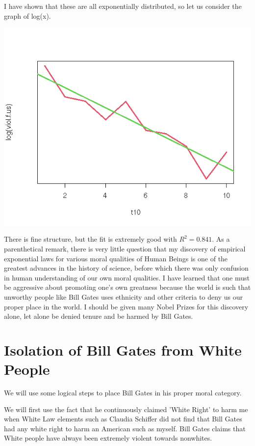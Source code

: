 \documentclass{amsart}
\begin{document}
I have shown that these are all exponentially distributed, so let us consider the graph of log(x).

\includegraphics[scale=0.8]{americanviolreg.jpeg}

There is fine structure, but the fit is extremely good with $R^2=0.841$.  As a parenthetical remark, there is very little question that my discovery of empirical exponential laws for various moral qualities of Human Beings is one of the greatest advances in the history of science, before which there was only confusion in human understanding of our own moral qualities.  I have learned that one must be aggressive about promoting one's own greatness because the world is such that unworthy people like Bill Gates uses ethnicity and other criteria to deny us our proper place in the world.  I should be given many Nobel Prizes for this discovery alone, let alone be denied tenure and be harmed by Bill Gates.


\section{Isolation of Bill Gates from White People}

We will use some logical steps to place Bill Gates in his proper moral category.

We will first use the fact that he continuously claimed 'White Right' to harm me when White Law elements such as Claudia Schiffer did not find that Bill Gates had any white right to harm an American such as myself.  Bill Gates claims that White people have always been extremely violent towards nonwhites.
\end{document}
